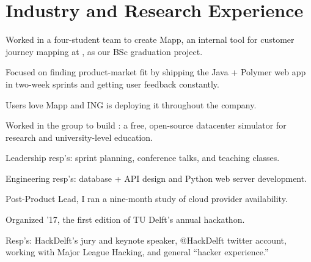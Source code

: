 \documentclass[]{deedy-resume-openfont}
\begin{document}
\hfill
\begin{minipage}[t]{0.66\textwidth} 


\section{Industry and Research Experience}

\vspace{\topsep}
\begin{tightemize}
    \item Worked in a four-student team to create Mapp, an internal tool for customer journey mapping at \href{https://www.ing.com/}{}, as our BSc graduation project.
    \item Focused on finding product-market fit by shipping the Java + Polymer web app in two-week sprints and getting user feedback constantly.
    \item Users love Mapp and ING is deploying it throughout the company.
\end{tightemize}
\vspace{0.5\topsep}

\begin{tightemize}
    \item Worked in the \href{https://atlarge-research.com/}{} group to build \href{https://opendc.org}{}: a free, open-source datacenter simulator for research and university-level education.
    \item Leadership resp's: sprint planning, conference talks, and teaching classes.
    \item Engineering resp's: database + API design and Python web server development.
    \item Post-Product Lead, I ran a nine-month study of cloud provider availability.
\end{tightemize}
\vspace{0.5\topsep}

\begin{tightemize}
    \item Organized \href{https://2017.hackdelft.nl/}{} '17, the first edition of TU Delft's annual hackathon.
    \item Resp's: HackDelft’s jury and keynote speaker, @HackDelft twitter account, working with Major League Hacking, and general ``hacker experience.''
\end{tightemize}
\vspace{0.3\topsep}


\end{minipage}
\end{document}
